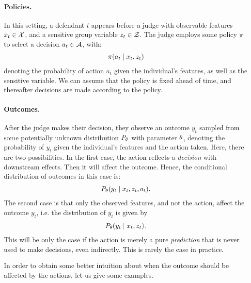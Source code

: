 \begin{frame}
  \paragraph{Policies.} In this setting, a defendant $t$ appears before a
  judge with observable features $x_t \in {\mathcal{X}}$, and a sensitive group
  variable $z_t \in {\mathcal{Z}}$. The judge employs some  policy $\pi$ to
  select a decision $a_t \in {\mathcal{A}}$, with:
  \begin{equation}
    \pi(a_t \mid x_t, z_t)
  \end{equation}
  denoting the probability of action $a_t$ given the individual's features, as well as the sensitive variable. We can assume that the policy is fixed ahead of time, and thereafter decisions are made according to the policy.
\end{frame}

\begin{frame}
  \paragraph{Outcomes.}
  After the judge makes their decision, they observe an outcome $y_t$ sampled from some potentially unknown distribution $P_\theta$ with parameter $\theta$,
  denoting the probability of $y_t$ given the individual's features
  and the action taken. Here, there are two possibilities. In the first case,
  the action reflects a \emph{decision} with downstream effects. Then it
  will affect the outcome. Hence, the conditional
  distribution of outcomes in this case is:
  \begin{equation}
    P_\theta(y_t \mid x_t, z_t, a_t).
  \end{equation}
The second case is that only the observed features, and not the action, affect the outcome $y_t$, i.e. the distribution of $y_t$ is given by
  \begin{equation}
    P_\theta(y_t \mid x_t, z_t).
  \end{equation}
  This will be only the case if the action is merely a pure
  \emph{prediction} that is never used to make decisions, even
  indirectly.  This is rarely the case in practice.

  
  In order to obtain some better intuition about when the outcome
  should be affected by the actions, let us give some examples.
\end{frame}


